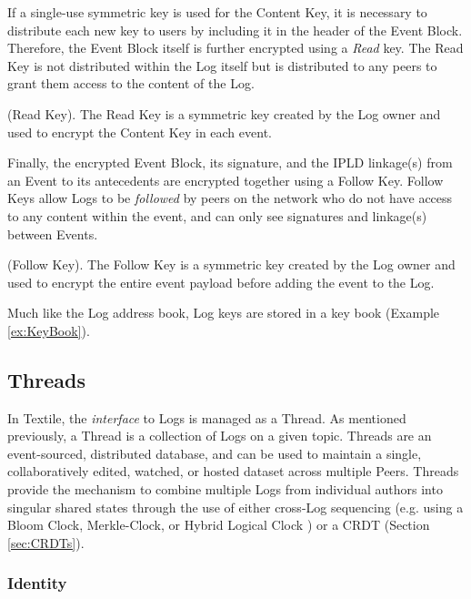 \documentclass{textile}
\begin{document}
If a single-use symmetric key is used for the Content Key, it is necessary to distribute each new key to users by including it in the header of the Event Block. Therefore, the Event Block itself is further encrypted using a \emph{Read} key. The Read Key is not distributed within the Log itself but is distributed to any peers to grant them access to the content of the Log. 

\begin{definition}
 (Read Key). The Read Key is a symmetric key created by the Log owner and used to encrypt the Content Key in each event.
\end{definition}

Finally, the encrypted Event Block, its signature, and the IPLD linkage(s) from an Event to its antecedents are encrypted together using a Follow Key. Follow Keys allow Logs to be \emph{followed} by peers on the network who do not have access to any content within the event, and can only see signatures and linkage(s) between Events.

\begin{definition}
(Follow Key). The Follow Key is a symmetric key created by the Log owner and used to encrypt the entire event payload before adding the event to the Log.
\end{definition}

Much like the Log address book, Log keys are stored in a key book (Example \ref{ex:KeyBook}).

\subsection{Threads}

In Textile, the \emph{interface} to Logs is managed as a Thread. As mentioned previously, a Thread is a collection of Logs on a given topic. Threads are an event-sourced, distributed database, and can be used to maintain a single, collaboratively edited, watched, or hosted dataset across multiple Peers. Threads provide the mechanism to combine multiple Logs from individual authors into singular shared states through the use of either cross-Log sequencing (e.g. using a Bloom Clock, Merkle-Clock, or Hybrid Logical Clock \cite{kulkarniLogicalPhysicalClocks2014}) or a CRDT (Section \ref{sec:CRDTs}).

\subsubsection{Identity}
\end{document}

